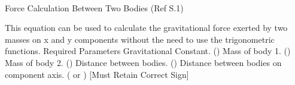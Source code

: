\paragraph{}
Force Calculation Between Two Bodies (Ref S.1)
 
This equation can be used to calculate the gravitational force exerted by two masses on x and y components without the need to use the trigonometric functions.
Required Parameters
Gravitational Constant. ()
Mass of body 1. ()
Mass of body 2. ()
Distance between bodies. ()
Distance between bodies on component axis. ( or ) [Must Retain Correct Sign]